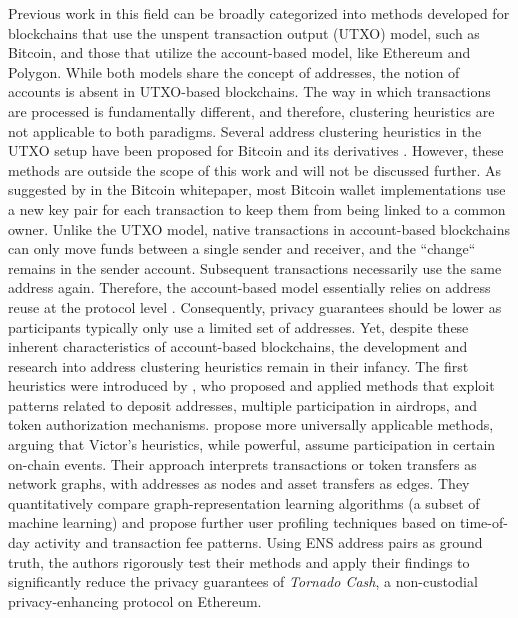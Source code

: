 \documentclass[12pt,a4paper,titlepage,oneside,english]{article}
\begin{document}
Previous work in this field can be broadly categorized into methods developed for blockchains that use the unspent transaction output (UTXO) model, such as Bitcoin, and those that utilize the account-based model, like Ethereum and Polygon. 
While both models share the concept of addresses, the notion of accounts is absent in UTXO-based blockchains. The way in which transactions are processed is fundamentally different, and therefore, clustering heuristics are not applicable to both paradigms. \newline
Several address clustering heuristics in the UTXO setup have been proposed for Bitcoin and its derivatives \citep{Androulaki2013, Meiklejohn2013, Haslhofer2016, jourdan2018, kappos2022}. However, these methods are outside the scope of this work and will not be discussed further. \newline 
As suggested by \cite{nakamotoBitcoin2008} in the Bitcoin whitepaper, most Bitcoin wallet implementations use a new key pair for each transaction to keep them from being linked to a common owner. Unlike the UTXO model, native transactions in account-based blockchains can only move funds between a single sender and receiver, and the ``change`` remains in the sender account. Subsequent transactions necessarily use the same address again. Therefore, the account-based model essentially relies on address reuse at the protocol level \citep{Beres2020}. Consequently, privacy guarantees should be lower as participants typically only use a limited set of addresses. \newline
Yet, despite these inherent characteristics of account-based blockchains, the development and research into address clustering heuristics remain in their infancy. 
The first heuristics were introduced by \cite{FV:17}, who proposed and applied methods that exploit patterns related to deposit addresses, multiple participation in airdrops, and token authorization mechanisms. \newline
\cite{Beres2020} propose more universally applicable methods, arguing that Victor’s heuristics, while powerful, assume participation in certain on-chain events. Their approach interprets transactions or token transfers as network graphs, with addresses as nodes and asset transfers as edges. They quantitatively compare graph-representation learning algorithms (a subset of machine learning) and propose further user profiling techniques based on time-of-day activity and transaction fee patterns. Using ENS address pairs as ground truth, the authors rigorously test their methods and apply their findings to significantly reduce the privacy guarantees of \textit{Tornado Cash}, a non-custodial privacy-enhancing protocol on Ethereum. \newline
\end{document}
